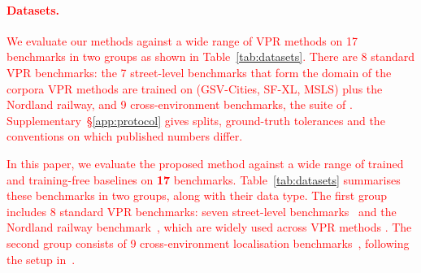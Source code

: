 \textcolor{red}{\paragraph{Datasets.} We evaluate our methods against a wide range of VPR methods on 17 benchmarks in two groups as shown in Table~\ref{tab:datasets}. There are 8 standard VPR benchmarks: the 7 street-level benchmarks that form the domain of the corpora VPR methods are trained on (GSV-Cities, SF-XL, MSLS) plus the Nordland railway, and 9 cross-environment benchmarks, the suite of \citet{anyloc}. Supplementary~\S\ref{app:protocol} gives splits, ground-truth tolerances and the conventions on which published numbers differ.}

\textcolor{red}{In this paper, we evaluate the proposed method against a wide range of trained and training-free baselines on \textbf{17} benchmarks. Table~\ref{tab:datasets} summarises these benchmarks in two groups, along with their data type. The first group includes 8 standard VPR benchmarks: seven street-level benchmarks~\citep{repetitive,densevlad,msls,stlucia,robotcar,amstertime} and the Nordland railway benchmark~\citep{nordland}, which are widely used across VPR methods \citep{netvlad,sfrs,cosplace,mixvpr,eigenplaces,r2former,salad,cricavpr,selavpr,boq,cliquemining,supervlad,vladbuff,megaloc,sage,gem,anyloc,segvlad,effovpr}.
The second group consists of 9 cross-environment localisation benchmarks~\citep{places17,baidumall,gardenspoint,vpair,eiffeltower}, following the setup in~\citet{anyloc}. 
}



